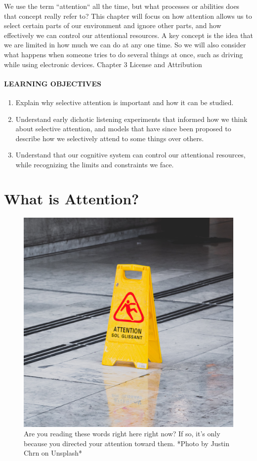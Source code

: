 \documentclass[
]{krantz}
\providecommand{\tightlist}{%
  \setlength{\itemsep}{0pt}\setlength{\parskip}{0pt}}
\begin{document}
We use the term ``attention`` all the time, but what processes or abilities does that concept really refer to? This chapter will focus on how attention allows us to select certain parts of our environment and ignore other parts, and how effectively we can control our attentional resources. A key concept is the idea that we are limited in how much we can do at any one time. So we will also consider what happens when someone tries to do several things at once, such as driving while using electronic devices. Chapter 3 License and Attribution

\hypertarget{learning-objectives-2}{%
\paragraph*{LEARNING OBJECTIVES}\label{learning-objectives-2}}

\begin{enumerate}
\def\labelenumi{\arabic{enumi}.}
\tightlist
\item
  Explain why selective attention is important and how it can be studied.
\item
  Understand early dichotic listening experiments that informed how we think about selective attention, and models that have since been proposed to describe how we selectively attend to some things over others.
\item
  Understand that our cognitive system can control our attentional resources, while recognizing the limits and constraints we face.
\end{enumerate}

\hypertarget{what-is-attention}{%
\section{What is Attention?}\label{what-is-attention}}

\begin{figure}

{\centering \includegraphics[width=0.5\linewidth]{images/ch3/attentionsign} 

}

\caption{Are you reading these words right here right now? If so, it’s only because you directed your attention toward them. *Photo by Justin Chrn on Unsplash*}\label{fig:attentionsign}
\end{figure}
\end{document}
